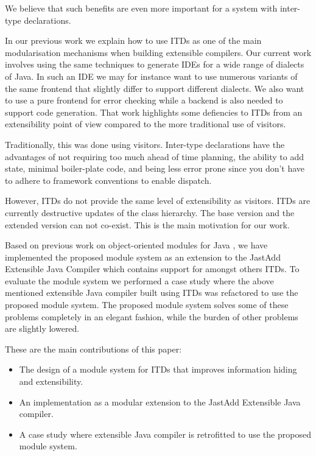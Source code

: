 We believe that such benefits are even more important for a system with
inter-type declarations. 




In our previous work we explain how to use ITDs as one of the main
modularisation mechanisms when building extensible compilers. Our current
work involves using the same techniques to generate IDEs for a wide range
of dialects of Java. In such an IDE we may for instance want to use numerous variants of the
same frontend that slightly differ to support different dialects. We also
want to use a pure frontend for error checking while a backend is also
needed to support code generation.
That work highlights some defiencies to ITDs from an extensibility point of
view compared to the more traditional use of visitors.

Traditionally, this was done using visitors. Inter-type declarations have the advantages of
not requiring too much ahead of time planning, the ability to add state, minimal boiler-plate code, 
and being less error prone since you don't have to adhere to framework conventions to enable dispatch.

However, ITDs do not provide the same level of extensibility as visitors.
ITDs are currently destructive updates of the class hierarchy. The base version and the
extended version can not co-exist. This is the main motivation for our
work. 

Based on previous work on object-oriented modules for Java \cite{modulesastypes}, 
we have implemented the proposed module system as an extension to the
Jast\-Add Extensible Java Compiler which contains support for amongst others
ITDs. 
To evaluate the module system we performed a case study where the above
mentioned extensible Java compiler built using ITDs was refactored to use
the proposed module system.
The proposed module system solves some of these problems completely in an
elegant fashion, while the burden of other problems are slightly lowered.

These are the main contributions of this paper:
\begin{itemize}
\item The design of a module system for ITDs that improves information
hiding and extensibility.
\item An implementation as a modular extension to the Jast\-Add Extensible
Java compiler.
\item A case study where extensible Java compiler is retrofitted to use the
proposed module system.
\end{itemize}

